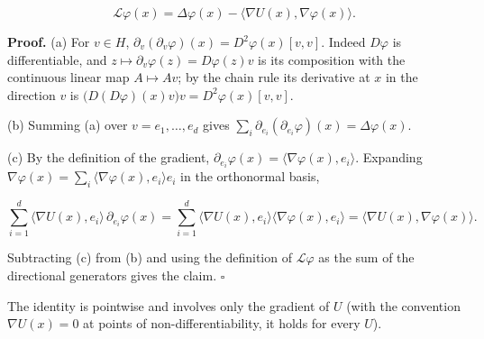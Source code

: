 \documentclass[11pt,a4paper]{article}
\begin{document}
\[\mathcal L\varphi(x)=\Delta\varphi(x)-\langle\nabla U(x),\nabla\varphi(x)\rangle.\]


\textbf{Proof.} (a) For \(v\in H\), \(\partial_v(\partial_v\varphi)(x)=D^2\varphi(x)[v,v]\). Indeed \(D\varphi\) is differentiable, and \(z\mapsto\partial_v\varphi(z)=D\varphi(z)v\) is its composition with the continuous linear map \(A\mapsto Av\); by the chain rule its derivative at \(x\) in the direction \(v\) is \(\bigl(D(D\varphi)(x)v\bigr)v=D^2\varphi(x)[v,v]\).




(b) Summing (a) over \(v=e_1,\dots,e_d\) gives \(\sum_i\partial_{e_i}(\partial_{e_i}\varphi)(x)=\Delta\varphi(x)\).




(c) By the definition of the gradient, \(\partial_{e_i}\varphi(x)=\langle\nabla\varphi(x),e_i\rangle\). Expanding \(\nabla\varphi(x)=\sum_i\langle\nabla\varphi(x),e_i\rangle e_i\) in the orthonormal basis,


\[\sum_{i=1}^d\langle\nabla U(x),e_i\rangle\,\partial_{e_i}\varphi(x)=\sum_{i=1}^d\langle\nabla U(x),e_i\rangle\langle\nabla\varphi(x),e_i\rangle=\langle\nabla U(x),\nabla\varphi(x)\rangle.\]


Subtracting (c) from (b) and using the definition of \(\mathcal L\varphi\) as the sum of the directional generators gives the claim. \(\square\)




The identity is pointwise and involves only the gradient of \(U\) (with the convention \(\nabla U(x)=0\) at points of non-differentiability, it holds for every \(U\)).
\end{document}

